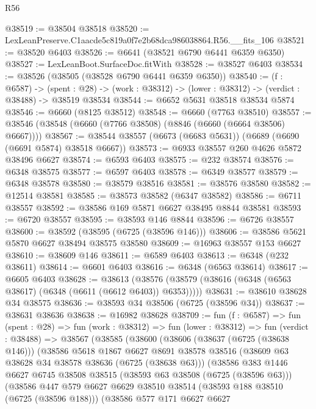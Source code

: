 \begin{lexlean}{R56}
\begin{coremodule}
@38519 := @38504 @38518
@38520 := LexLeanPreserve.C1aacde5c819a0f7e2b68dca986038864.R56.__fits_106
@38521 := @38520 @6403
@38526 := @6641 (@38521 @6790 @6441 @6359 @6350)
@38527 := LexLeanBoot.SurfaceDoc.fitWith
@38528 := @38527 @6403
@38534 := @38526 (@38505 (@38528 @6790 @6441 @6359 @6350))
@38540 := (f : @6587) ->
  (spent : @28) -> (work : @38312) -> (lower : @38312) -> (verdict : @38488) -> @38519 @38534
@38544 := @6652 @5631 @38518 @38534 @5874
@38546 := @6660 (@8125 @38512)
@38548 := @6660 (@7763 @38510)
@38557 := @38546 (@38548 (@6660 (@7766 @38508) (@8846 (@6660 (@6664 @38506) @6667))))
@38567 := @38544 @38557 (@6673 (@6683 @5631)) (@6689 (@6690 (@6691 @5874) @38518 @6667))
@38573 := @6933 @38557 @260 @4626 @5872 @38496 @6627
@38574 := @6593 @6403
@38575 := @232 @38574
@38576 := @6348 @38575
@38577 := @6597 @6403
@38578 := @6349 @38577
@38579 := @6348 @38578
@38580 := @38579 @38516
@38581 := @38576 @38580
@38582 := @12514 @38581
@38585 := @38573 @38582 (@6347 @38582)
@38586 := @6711 @38557
@38592 := @38586 @169 @5871 @6627 @38495 @8844 @38581
@38593 := @6720 @38557
@38595 := @38593 @146 @8844
@38596 := @6726 @38557
@38600 := @38592 (@38595 (@6725 (@38596 @146)))
@38606 := @38586 @5621 @5870 @6627 @38494 @38575 @38580
@38609 := @16963 @38557 @153 @6627
@38610 := @38609 @146
@38611 := @6589 @6403
@38613 := @6348 (@232 @38611)
@38614 := @6601 @6403
@38616 := @6348 (@6563 @38614)
@38617 := @6605 @6403
@38628 := @38613
    (@38576 (@38579 (@38616 (@6348 (@6563 @38617) (@6348 (@6611 (@6612 @6403)) @6353)))))
@38631 := @38610 @38628 @34 @38575
@38636 := @38593 @34 @38506 (@6725 (@38596 @34))
@38637 := @38631 @38636
@38638 := @16982 @38628
@38709 := fun (f : @6587) =>
  fun (spent : @28) =>
  fun (work : @38312) =>
  fun (lower : @38312) =>
  fun (verdict : @38488) =>
  @38567
    (@38585
      (@38600
        (@38606
          (@38637 (@6725 (@38638 @146)))
          (@38586
            @5618
            @1867
            @6627
            @8691
            @38578
            @38516
            (@38609 @63 @38628 @34 @38578 @38636 (@6725 (@38638 @63)))
            (@38586
              @383
              @1446
              @6627
              @6745
              @38508
              @38515
              (@38593 @63 @38508 (@6725 (@38596 @63)))
              (@38586
                @447
                @579
                @6627
                @6629
                @38510
                @38514
                (@38593 @188 @38510 (@6725 (@38596 @188)))
                (@38586
                  @577
                  @171
                  @6627
                  @6627

\end{coremodule}
\end{lexlean}
